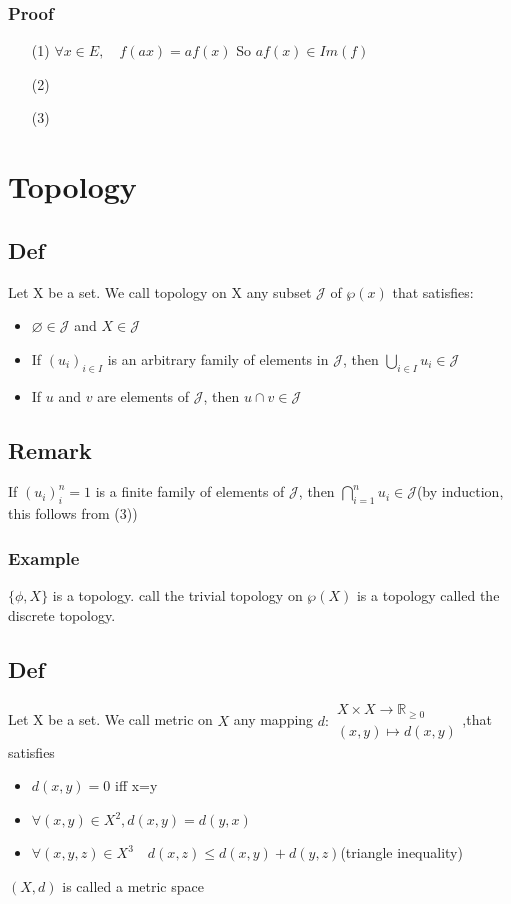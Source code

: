 \documentclass{book}
\begin{document}
\subsection{Proof}
\begin{itemize}
    \item[(1)] $\forall x\in E,\quad f(ax)=af(x)$ So $ af(x)\in Im(f)$
    \item [(2)]
    \item [(3)]
\end{itemize}
\chapter{Topology}
\section{Def}
Let X be a set. We call topology on X any subset $\mathcal{J} $ of $\wp (x)$ that satisfies:\begin{itemize}
    \item $\varnothing\in \mathcal{J} $ and $X\in \mathcal{J} $
    \item If $(u_i)_{i\in I}$ is an arbitrary family of elements in $\mathcal{J} $, then $\bigcup\limits_{i\in I}u_i\in \mathcal{J} $
    \item If $u$ and $v$ are elements of $\mathcal{J} $, then $u\cap v\in \mathcal{J} $
\end{itemize}
\section{Remark}
If $(u_i)^n_i=1$ is a finite family of elements of $\mathcal{J} $, then $\bigcap\limits_{i=1}^{n}u_i\in \mathcal{J}$(by induction, this follows from (3))
\subsection{Example}
$\{\phi,X\}$ is a topology. call the trivial topology on $\wp (X)$ is a topology called the discrete topology.
\section{Def}
Let X be a set. We call metric on $X$ any mapping $d:\begin{aligned}
    X\times X\rightarrow\mathbb{R} _{\geq 0}\\(x,y)\mapsto d(x,y)
\end{aligned}$,that satisfies\begin{itemize}
    \item $d(x,y)=0$ iff x=y
    \item $\forall(x,y)\in X^2, d(x,y)=d(y,x)$
    \item $\forall(x,y,z)\in X^3\quad d(x,z)\leq d(x,y)+d(y,z)$(triangle inequality)
\end{itemize}
$(X,d)$ is called a metric space
\end{document}
